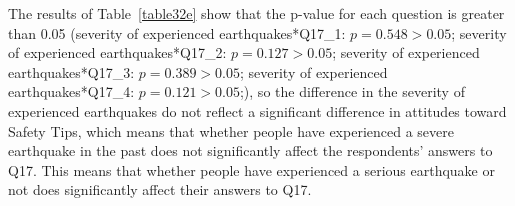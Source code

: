 The results of Table~\ref{table32e} show that the p-value for each question is greater than 0.05 (severity of experienced earthquakes*Q17\_1: $p=0.548>0.05$; severity of experienced earthquakes*Q17\_2: $p=0.127>0.05$; severity of experienced earthquakes*Q17\_3: $p=0.389>0.05$; severity of experienced earthquakes*Q17\_4: $p=0.121>0.05$;), so the difference in the severity of experienced earthquakes do not reflect a significant difference in attitudes toward Safety Tips, which means that whether people have experienced a severe earthquake in the past does not significantly affect the respondents' answers to Q17. This means that whether people have experienced a serious earthquake or not does significantly affect their answers to Q17.






